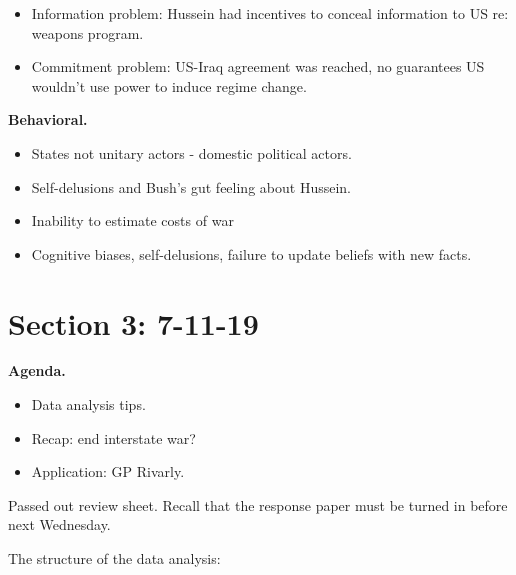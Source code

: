 \documentclass{article}
\begin{document}
\begin{itemize}
  \item Information problem: Hussein had incentives to conceal information to US re: weapons program.
  \item Commitment problem: US-Iraq agreement was reached, no guarantees US wouldn't use power to induce regime change.
\end{itemize}

{\bf Behavioral.}

\begin{itemize}
  \item States not unitary actors - domestic political actors.
  \item Self-delusions and Bush's gut feeling about Hussein.
  \item Inability to estimate costs of war
  \item Cognitive biases, self-delusions, failure to update beliefs with new facts.
\end{itemize}

\section{Section 3: 7-11-19}

{\bf Agenda.}

\begin{itemize}
  \item Data analysis tips.
  \item Recap: end interstate war?
  \item Application: GP Rivarly.
\end{itemize}

Passed out review sheet.  Recall that the response paper must be turned in before next Wednesday.

The structure of the data analysis:
\end{document}
